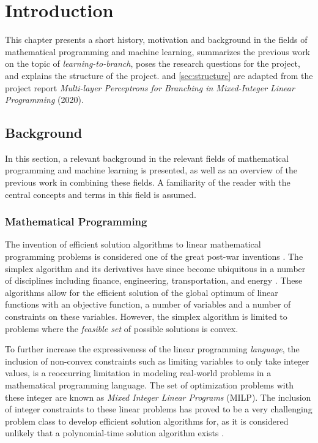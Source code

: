 \chapter{Introduction}\label{cha:introduction}
%
This chapter presents a short history, motivation and background in the fields of mathematical programming and machine learning, summarizes the previous work on the topic of \textit{learning-to-branch}, poses the research questions for the project, and explains the structure of the project.  and \ref{sec:structure} are adapted from the project report \textit{Multi-layer Perceptrons for Branching in Mixed-Integer Linear Programming} (2020). 


\section{Background}\label{sec:background}

In this section, a relevant background in the relevant fields of mathematical programming and machine learning is presented, as well as an overview of the previous work in combining these fields. A familiarity of the reader with the central concepts and terms in this field is assumed.

\subsection{Mathematical Programming}

The invention of efficient solution algorithms to linear mathematical programming problems is considered one of the great post-war inventions \cite{dantzig1983reminiscences}. The simplex algorithm and its derivatives have since become ubiquitous in a number of disciplines including finance, engineering, transportation, and energy \cite{junger2010years}. These algorithms allow for the efficient solution of the global optimum of linear functions with an objective function, a number of variables and a number of constraints on these variables. However, the simplex algorithm is limited to problems where the \textit{feasible set} of possible solutions is convex.

To further increase the expressiveness of the linear programming \textit{language}, the inclusion of non-convex constraints such as limiting variables to only take integer values, is a reoccurring limitation in modeling real-world problems in a mathematical programming language. The set of optimization problems with these integer are known as \textit{Mixed Integer Linear Programs} (\gls{MILP}). The inclusion of integer constraints to these linear problems has proved to be a very challenging problem class to develop efficient solution algorithms for, as it is considered unlikely that a polynomial-time solution algorithm exists \cite{bengio2020machine}.

